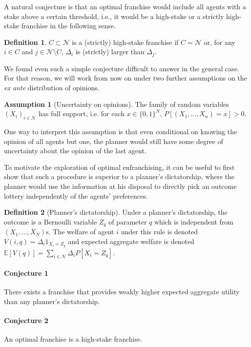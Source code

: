 \documentclass{article}
\theoremstyle{definition}
\newtheorem{definition}{Definition}[]
\theoremstyle{theorem}
\newtheorem{assumption}{Assumption}
\begin{document}
A natural conjecture is that an optimal franchise would include all agents with a stake above a certain threshold, i.e., it would be a high-stake or a strictly high-stake franchise in the following sense.

\begin{definition}
    $C \subset \mathcal{N}$ is a (strictly) high-stake franchise if $C = \mathcal{N}$ or, for any $i \in C$ and $j \in \mathcal{N} \setminus C$, $\Delta_i$ is (strictly) larger than $\Delta_j$.
\end{definition}


We found even such a simple conjecture difficult to answer in the general case. For that reason, we will work from now on under two further assumptions on the \textit{ex ante} distribution of opinions.

\begin{assumption}[Uncertainty on opinions]
    The family of random variables $(X_i)_{i \in \mathcal{N}}$ has full support, i.e. for each $x \in \{0,1\}^N$, $P[(X_1, ..., X_n) = x] > 0$.
\end{assumption}

One way to interpret this assumption is that even conditional on knowing the opinion of all agents but one, the planner would still have some degree of uncertainty about the opinion of the last agent.

To motivate the exploration of optimal enfranchising, it can be useful to first show that such a procedure is superior to a planner's dictatorship, where the planner would use the information at his disposal to directly pick an outcome lottery independently of the agents' preferences.

\begin{definition}[Planner's dictatorship]
    Under a planner's dictatorship, the outcome is a Bernoulli variable $Z_q$ of parameter $q$ which is independent from $(X_1, ..., X_N)$s. The welfare of agent $i$ under this rule is denoted $V(i,q) = \Delta_i 1_{X_i = Z_q}$ and expected aggregate welfare is denoted $\mathbb{E}[V(q)] = \sum_{i \in \mathcal{N}} \Delta_i P[X_i = Z_q]$.
\end{definition}


\paragraph{Conjecture 1} There exists a franchise that provides weakly higher expected aggregate utility than any planner's dictatorship.

\paragraph{Conjecture 2} An optimal franchise is a high-stake franchise.
\end{document}
